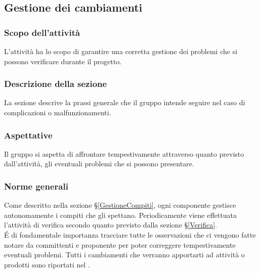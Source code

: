 \subsection{Gestione dei cambiamenti}\label{GestioneCambiamenti}
\subsubsection{Scopo dell'attività} 
L'attività ha lo scopo di garantire una corretta gestione dei problemi che si possono verificare durante il progetto.

\subsubsection{Descrizione della sezione} 
La sezione descrive la prassi generale che il gruppo intende seguire nel caso di complicazioni o malfunzionamenti.

\subsubsection{Aspettative}
Il gruppo si aspetta di affrontare tempestivamente attraverso quanto previsto dall'attività, gli eventuali problemi che si possono presentare.

\subsubsection{Norme generali} \label{GCambiamenti_Norme}
Come descritto nella sezione \S\ref{GestioneCompiti}, ogni componente gestisce autonomamente i compiti che gli spettano. Periodicamente viene effettuata l'attività di verifica secondo quanto previsto dalla sezione \S\ref{Verifica}.\\ É di fondamentale importanza tracciare tutte le osservazioni che ci vengono fatte notare da committenti e proponente per poter correggere tempestivamente eventuali problemi. 
Tutti i cambiamenti che verranno apportarti ad attività o prodotti sono riportati nel .

